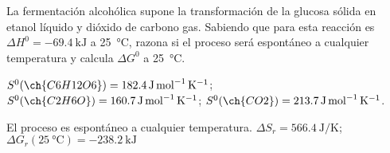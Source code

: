   \begin{exercise}[
        tags    = {termodinámica, entalpía, entalpia de reacción, calor},
        topics  = {química, termoquímica, termodinámica},
        source  = {FQ 1B ANA 2016, p167, e34},
    ]
    La fermentación alcohólica supone la transformación de la glucosa sólida en etanol líquido y dióxido de carbono gas. Sabiendo que para esta reacción es \( \Delta H^0 = \SI{-69.4}{\kilo\joule} \) a \SI{25}{\celsius}, razona si el proceso será espontáneo a
    cualquier temperatura y calcula \( \Delta G^0 \) a \SI{25}{\celsius}.

    \begin{gexdatos}
        \( S^0 (\ch{C6H12O6}) = \SI{182.4}{\joule\per\mole\per\kelvin} \);
        \( S^0 (\ch{C2H6O}) = \SI{160.7}{\joule\per\mole\per\kelvin} \);
        \( S^0 (\ch{CO2}) = \SI{213.7}{\joule\per\mole\per\kelvin} \).
    \end{gexdatos}
  \end{exercise}

  \begin{solution}
    El proceso es espontáneo a cualquier temperatura. \( \Delta S_r = \SI{566.4}{\joule\per\kelvin} \); \( \Delta G_r (\SI{25}{\celsius}) = \SI{-238.2}{\kilo\joule} \)
  \end{solution}
